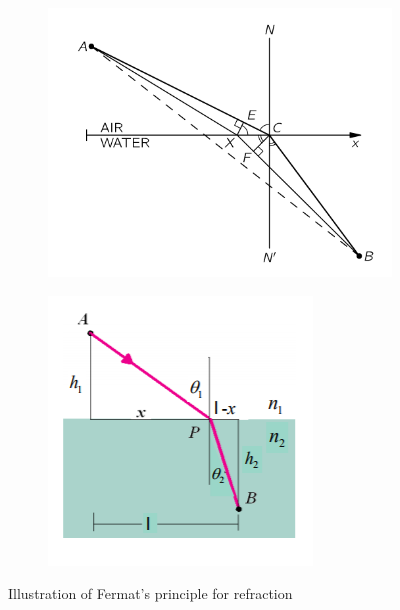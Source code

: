 \documentclass[../main.tex]{subfiles}
\begin{document}
	\begin{figure}[h!]
		\centering
		\begin{subfigure}[b]{0.4\linewidth}
			\includegraphics[width=\linewidth]{../graphics/Geometrical_optics3.png}
		\end{subfigure}
		\begin{subfigure}[b]{0.4\linewidth}
			\includegraphics[width=\linewidth]{../graphics/Geometrical_optics4.png}
		\end{subfigure}
		\caption{Illustration of Fermat’s principle for refraction}
	  	\label{fig:Fermat1}	  
	\end{figure}
\end{document}
